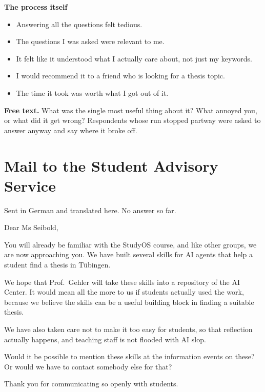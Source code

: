 \documentclass[11pt,a4paper]{article}
\begin{document}
\noindent \textbf{The process itself}

\begin{itemize}[leftmargin=1.4em,itemsep=0.2em]
  \item Answering all the questions felt tedious.
  \item The questions I was asked were relevant to me.
  \item It felt like it understood what I actually care about, not just my keywords.
  \item I would recommend it to a friend who is looking for a thesis topic.
  \item The time it took was worth what I got out of it.
\end{itemize}

\noindent \textbf{Free text.} What was the single most useful thing about it?
What annoyed you, or what did it get wrong? Respondents whose run stopped
partway were asked to answer anyway and say where it broke off.

\section{Mail to the Student Advisory Service}
\label{app:seibold-mail}

\noindent Sent in German and translated here. No answer so far.

\medskip
\noindent Dear Ms Seibold,

\medskip
\noindent You will already be familiar with the StudyOS course, and like other
groups, we are now approaching you. We have built several skills for AI agents
that help a student find a thesis in T\"ubingen.

\medskip
\noindent We hope that Prof.\ Gehler will take these skills into a repository of
the AI Center. It would mean all the more to us if students actually used the
work, because we believe the skills can be a useful building block in finding a
suitable thesis.

\medskip
\noindent We have also taken care not to make it too easy for students, so that
reflection actually happens, and teaching staff is not flooded with AI slop.

\medskip
\noindent Would it be possible to mention these skills at the information events
on these? Or would we have to contact somebody else for that?

\medskip
\noindent Thank you for communicating so openly with students.
\end{document}
